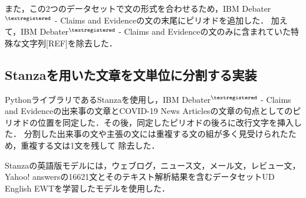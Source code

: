 \documentclass[12pt,a4j,dvipdfmx]{jreport}
\begin{document}

また，この2つのデータセットで文の形式を合わせるため，IBM Debater$^{\textregistered}$ - Claims and Evidenceの文の末尾にピリオドを追加した．
加えて，IBM Debater$^{\textregistered}$ - Claims and Evidenceの文のみに含まれていた特殊な文字列[REF]を除去した．

\newpage


\subsection{Stanzaを用いた文章を文単位に分割する実装}
PythonライブラリであるStanzaを使用し，IBM Debater$^{\textregistered}$ - Claims and Evidenceの出来事の文章とCOVID-19 News Articlesの文章の句点としてのピリオドの位置を同定した．その後，同定したピリオドの後ろに改行文字を挿入した．
分割した出来事の文や主張の文には重複する文の組が多く見受けられたため，重複する文は1文を残して
除去した．

Stanzaの英語版モデルには，ウェブログ，ニュース文，メール文，レビュー文，Yahoo! answersの16621文とそのテキスト解析結果を含むデータセットUD English EWTを学習したモデルを使用した． 
\end{document}
